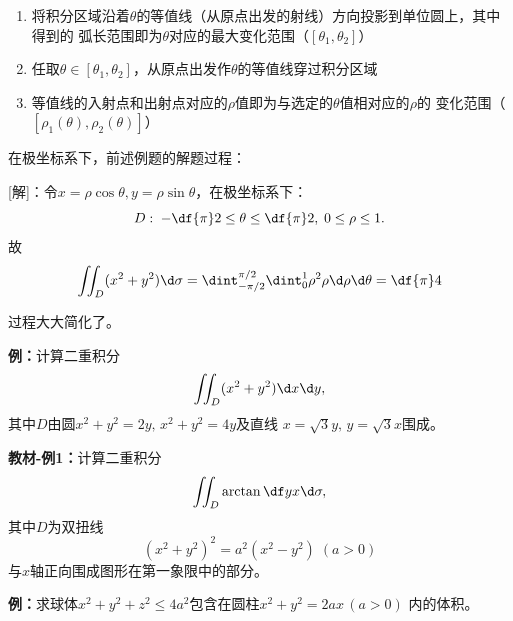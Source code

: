 \begin{enumerate}[Step-1:]
  \setlength{\itemindent}{1cm}
  \item 将积分区域沿着$\theta$的等值线（从原点出发的射线）方向投影到单位圆上，其中得到的
  弧长范围即为$\theta$对应的最大变化范围（$[\theta_1,\theta_2]$）
  \item 任取$\theta\in[\theta_1,\theta_2]$，从原点出发作$\theta$的等值线穿过积分区域
  \item 等值线的入射点和出射点对应的$\rho$值即为与选定的$\theta$值相对应的$\rho$的
  变化范围（$[\rho_1(\theta),\rho_2(\theta)]$）
\end{enumerate}

在极坐标系下，前述例题的解题过程：

[解]：令$x=\rho\cos\theta,y=\rho\sin\theta$，在极坐标系下：
$$D:\;-\df{\pi}2\leq\theta\leq\df{\pi}2,
\;0\leq\rho\leq1.$$
故
$$\iint_D(x^2+y^2)\d\sigma
=\dint_{-\pi/2}^{\pi/2}\dint_0^1\rho^2\rho\d\rho\d\theta
=\df{\pi}4
$$

过程大大简化了。

{\bf 例：}计算二重积分
$$\iint_D(x^2+y^2)\d x\d y,$$
其中$D$由圆$x^2+y^2=2y,\,x^2+y^2=4y$及直线
$x=\sqrt 3y,\,y=\sqrt 3x$围成。

{\bf 教材-例1：}计算二重积分
$$\iint_D\arctan\df yx\d\sigma,$$
其中$D$为双扭线
$$(x^2+y^2)^2=a^2(x^2-y^2)\;(a>0)$$
与$x$轴正向围成图形在第一象限中的部分。

\begin{center}
\end{center}

{\bf 例：}求球体$x^2+y^2+z^2\leq 4a^2$包含在圆柱$x^2+y^2=2ax\,(a>0)$
内的体积。

